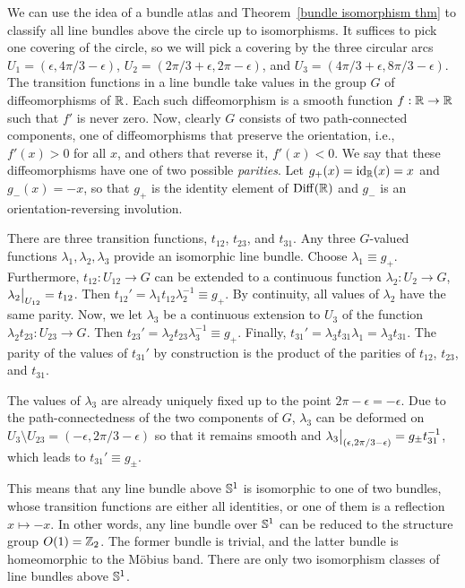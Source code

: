 \begin{example}\label{line bundles over S1}
    We can use the idea of a bundle atlas and Theorem~\ref{bundle isomorphism thm} to classify all line bundles above the circle up to isomorphisms. It suffices to pick one covering of the circle, so we will pick a covering by the three circular arcs $U_1=(\epsilon,4\pi/3-\epsilon)$, $U_2=(2\pi/3+\epsilon,2\pi-\epsilon)$, and $U_3=(4\pi/3+\epsilon,8\pi/3-\epsilon)$. The transition functions in a line bundle take values in the group $G$ of diffeomorphisms of $\mathbb{R} $. Each such diffeomorphism is a smooth function $f:\mathbb{R} \to\mathbb{R} $ such that $f'$ is never zero. Now, clearly $G$ consists of two path-connected components, one of diffeomorphisms that preserve the orientation, i.e., $f'(x)>0$ for all $x$, and others that reverse it, $f'(x)<0$. We say that these diffeomorphisms have one of two possible \emph{parities}. Let $g_+(x)=\operatorname{id}_{\mathbb{R} }(x)=x$ and $g_-(x)=-x$, so that $g_+$ is the identity element of $\operatorname{Diff}(\mathbb{R} )$ and $g_-$ is an orientation-reversing involution.

    There are three transition functions, $t_{12}$, $t_{23}$, and $t_{31}$. Any three $G$-valued functions $\lambda_1,\lambda_2,\lambda_3$ provide an isomorphic line bundle. Choose $\lambda_1\equiv g_+$. Furthermore, $t_{12}:U_{12}\to G$ can be extended to a continuous function $\lambda_2: U_2\to G$, $\restr{\lambda_2}{U_{12}}=t_{12}$. Then $t_{12}'=\lambda_1 t_{12}\lambda_2^{-1}\equiv g_+$. By continuity, all values of $\lambda_2$ have the same parity.  Now, we let $\lambda_3$ be a continuous extension to $U_3$ of the function $\lambda_2 t_{23}:U_{23}\to G$. Then $t_{23}'=\lambda_2 t_{23} \lambda_3^{-1}\equiv g_+$. Finally, $t_{31}'=\lambda_3 t_{31} \lambda_1=\lambda_3 t_{31}$.  The parity of the values of $t_{31}'$ by construction is the product of the parities of $t_{12}$, $t_{23}$, and $t_{31}$.

    The values of $\lambda_3$ are already uniquely fixed up to the point $2\pi-\epsilon=-\epsilon$. Due to the path-connectedness of the two components of $G$, $\lambda_3$ can be deformed on $U_3\setminus U_{23}=(-\epsilon,2\pi/3-\epsilon)$ so that it remains smooth and $\restr{\lambda_3}{(\epsilon,2\pi/3-\epsilon)}=g_\pm t_{31}^{-1}$, which leads to $t_{31}'\equiv g_\pm$.

    This means that any line bundle above $\mathbb{S}^1$ is isomorphic to one of two bundles, whose transition functions are either all identities, or one of them is a reflection $x\mapsto -x$.  In other words, any line bundle over $\mathbb{S}^1$ can be reduced to the structure group $O(1)=\mathbb{Z}_2$. The former bundle is trivial, and the latter bundle is homeomorphic to the M\"obius band. There are only two isomorphism classes of line bundles above $\mathbb{S}^1$.
\end{example}

